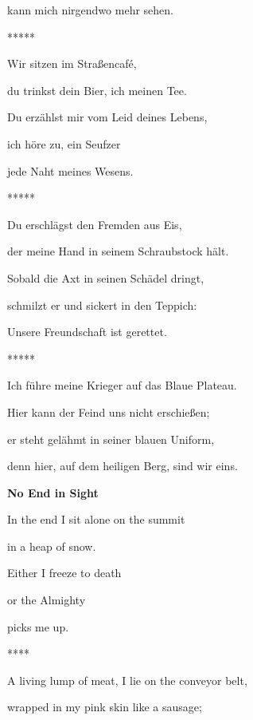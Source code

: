 \documentclass[a4paper]{article}
\begin{document}
kann mich nirgendwo mehr sehen.


\bigskip

*****


\bigskip

Wir sitzen im Straßencafé,

du trinkst dein Bier, ich meinen Tee.

Du erzählst mir vom Leid deines Lebens,

ich höre zu, ein Seufzer

jede Naht meines Wesens.


\bigskip

*****


\bigskip

Du erschlägst den Fremden aus Eis, 

der meine Hand in seinem Schraubstock hält.

Sobald die Axt in seinen Schädel dringt,

schmilzt er und sickert in den Teppich:

Unsere Freundschaft ist gerettet.


\bigskip

*****


\bigskip

Ich führe meine Krieger auf das Blaue Plateau.

Hier kann der Feind uns nicht erschießen;

er steht gelähmt in seiner blauen Uniform, 

denn hier, auf dem heiligen Berg, sind wir eins.


\bigskip


\bigskip

\clearpage
\bigskip

{\bfseries
No End in Sight}


\bigskip


\bigskip

In the end I sit alone on the summit

in a heap of snow.

Either I freeze to death

or the Almighty

picks me up.


\bigskip


\bigskip

****


\bigskip

A living lump of meat, I lie on the conveyor belt,

wrapped in my pink skin like a sausage;
\end{document}

